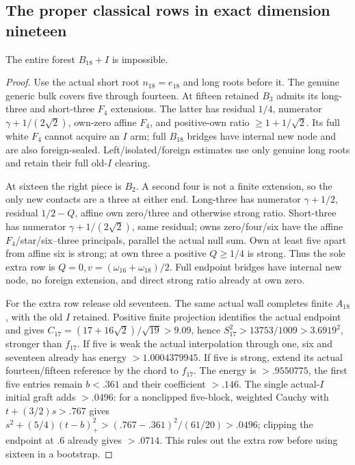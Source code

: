 \subsection{The proper classical rows in exact dimension nineteen}
\begin{lemma}\label{app:tail:lem:B18I}
The entire forest $B_{18}+I$ is impossible.
\end{lemma}
\begin{proof}
Use the actual short root $n_{18}=e_{18}$ and long roots before it.
The genuine generic bulk covers five through fourteen.
At fifteen retained $B_3$ admits its long-three and short-three
$F_4$ extensions. The latter has residual $1/4$, numerator
$\gamma+1/(2\sqrt2)$, own-zero affine $F_4$, and positive-own
ratio $\ge1+1/\sqrt2$. Its full white $F_4$ cannot acquire
an $I$ arm; full $B_{18}$ bridges have internal new node and
are also foreign-sealed. Left/isolated/foreign estimates use
only genuine long roots and retain their full old-$I$ clearing.

At sixteen the right piece is $B_2$. A second four is not a
finite extension, so the only new contacts are a three at either
end. Long-three has numerator $\gamma+1/2$, residual
$1/2-Q$, affine own zero/three and otherwise strong ratio.
Short-three has numerator $\gamma+1/(2\sqrt2)$, same residual;
owns zero/four/six have the affine $F_4$/star/six--three
principals, parallel the actual null sum. Own at least five
apart from affine six is strong; at own three a positive
$Q\ge1/4$ is strong. Thus the sole extra row is
$Q=0,v=(\omega_{16}+\omega_{18})/2$.
Full endpoint bridges have internal new node, no foreign
extension, and direct strong ratio already at own zero.

For the extra row release old seventeen. The same actual wall
completes finite $A_{18}$, with the old $I$ retained.
Positive finite projection identifies the actual endpoint and
gives $C_{17}=(17+16\sqrt2)/\sqrt{19}>9.09$, hence
$S_{17}^2>13753/1009>3.6919^2$, stronger than $f_{17}$.
If five is weak the actual interpolation through one, six and seventeen already
has energy $>1.0004379945$.
If five is strong, extend its actual fourteen/fifteen reference
by the chord to $f_{17}$. The energy is $>.9550775$, the first
five entries remain $b<.361$ and their coefficient $>.146$.
The single actual-$I$ initial graft adds $>.0496$: for a
nonclipped five-block, weighted Cauchy with
$t+(3/2)s>.767$ gives
$s^2+(5/4)(t-b)_+^2>(.767-.361)^2/(61/20)>.0496$;
clipping the endpoint at $.6$ already gives $>.0714$.
This rules out the extra row before using sixteen in a bootstrap.


\end{proof}

